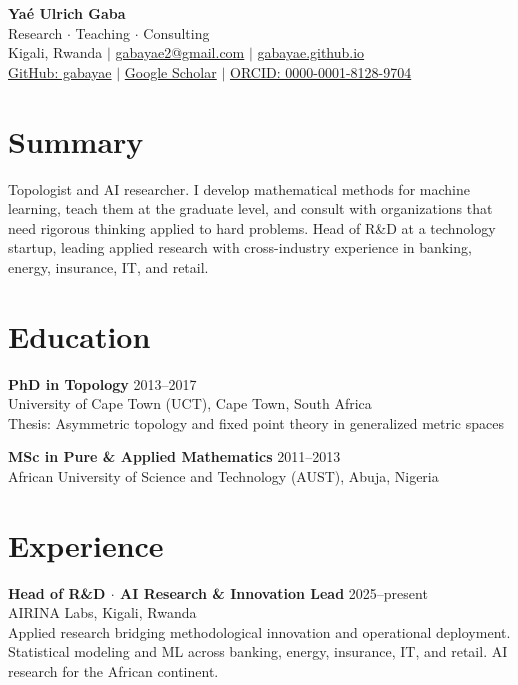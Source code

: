 \documentclass[11pt,a4paper]{article}
\begin{document}
\begin{center}
{\LARGE\bfseries Ya\'e Ulrich Gaba}\\[4pt]
{\normalsize Research $\cdot$ Teaching $\cdot$ Consulting}\\[4pt]
{\small Kigali, Rwanda \quad $|$ \quad \href{mailto:gabayae2@gmail.com}{gabayae2@gmail.com} \quad $|$ \quad \href{https://gabayae.github.io}{gabayae.github.io}}\\[2pt]
{\small \href{https://github.com/gabayae}{GitHub: gabayae} \quad $|$ \quad \href{https://scholar.google.com/citations?user=UTszjV4AAAAJ}{Google Scholar} \quad $|$ \quad \href{https://orcid.org/0000-0001-8128-9704}{ORCID: 0000-0001-8128-9704}}
\end{center}

\vspace{4pt}

\section{Summary}

Topologist and AI researcher. I develop mathematical methods for machine learning, teach them at the graduate level, and consult with organizations that need rigorous thinking applied to hard problems. Head of R\&D at a technology startup, leading applied research with cross-industry experience in banking, energy, insurance, IT, and retail.

\section{Education}

\textbf{PhD in Topology} \hfill 2013--2017\\
University of Cape Town (UCT), Cape Town, South Africa\\
{\small Thesis: Asymmetric topology and fixed point theory in generalized metric spaces}

\medskip

\textbf{MSc in Pure \& Applied Mathematics} \hfill 2011--2013\\
African University of Science and Technology (AUST), Abuja, Nigeria

\section{Experience}

\textbf{Head of R\&D $\cdot$ AI Research \& Innovation Lead} \hfill 2025--present\\
AIRINA Labs, Kigali, Rwanda\\
{\small Applied research bridging methodological innovation and operational deployment. Statistical modeling and ML across banking, energy, insurance, IT, and retail. AI research for the African continent.}
\end{document}
